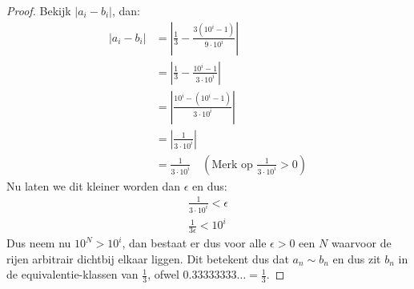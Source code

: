 \documentclass{article}
\newcommand{\tx}[1]{\text{#1}}
\newcommand{\f}[2]{\frac{#1}{#2}}
\begin{document}
\begin{enumerate}[label=\alph*)]
\begin{proof}
              Bekijk $|a_i - b_i|$, dan:
              \begin{align*}
                  |a_i - b_i| & = \left|\f{1}{3}
                  - \f{3(10^i - 1)}{9 \cdot 10^i}\right|   \\
                              & = \left|\f{1}{3}
                  - \f{10^i - 1}{3 \cdot 10^i}
                  \right|                                  \\
                              & = \left|\f{10^i -
                  (10^i - 1)}{3\cdot 10^i}\right|          \\
                              & = \left|\f{1}{3\cdot 10^i}
                  \right|                                  \\
                              & =  \f{1}{3 \cdot 10^i}
                  \quad (\tx{Merk op }
                  \f{1}{3\cdot 10^i } > 0 )
              \end{align*}
              Nu laten we dit kleiner worden dan
              $\epsilon$ en dus:
              \begin{align*}
                  \f{1}{3 \cdot 10^i} < \epsilon \\
                  \f{1}{3 \epsilon} < 10^i
              \end{align*}
              Dus neem nu $10^N > 10^i$,
              dan bestaat er dus voor alle $\epsilon > 0$
              een $N$ waarvoor de rijen arbitrair dichtbij
              elkaar liggen.
              Dit betekent dus dat $a_n \sim b_n$
              en dus zit $b_n$ in de
              equivalentie-klassen van $\f{1}{3}$,
              ofwel $0.33333333\dots = \f{1}{3}$.
          \end{proof}
\end{enumerate}
\end{document}
